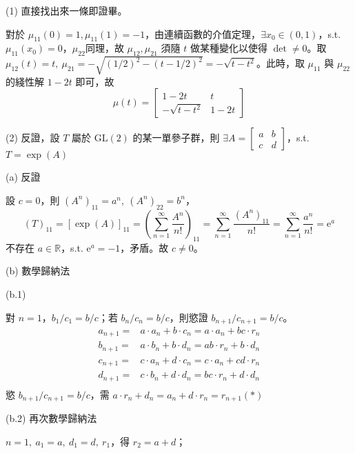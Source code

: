 \documentclass{article}
\begin{document}
\begin{framed}
  (1) 直接找出來一條即證畢。

  對於 $\mu_{11}(0)=1,\mu_{11}(1)=-1$，由連續函數的介值定理，$\exists x_0\in(0,1)$，s.t. $\mu_{11}(x_0)=0$，$\mu_{22}$同理，故 $\mu_{12},\mu_{21}$ 須隨 $t$ 做某種變化以使得 $\det\neq 0$。取 $\mu_{12}(t)=t,\ \mu_{21}=-\sqrt{(1/2)^2-(t-1/2)^2}=-\sqrt{t-t^2}$。此時，取 $\mu_{11}$ 與 $\mu_{22}$ 的綫性解 $1-2t$ 即可，故
  $$\mu(t)=\begin{bmatrix}
      1-2t          & t    \\
      -\sqrt{t-t^2} & 1-2t
    \end{bmatrix}$$

  (2) 反證，設 $T$ 屬於 $\mathrm{GL}(2)$ 的某一單參子群，則 $\exists A=\begin{bmatrix}  a &b \\  c& d \end{bmatrix}$，s.t. $T=\exp(A)$

  (a) 反證

  設 $c=0$，則 $(A^n)_{11}=a^n,\ (A^n)_{22}=b^n$，
  $${\left( T \right)_{11}} = {\left[ {\exp \left( A \right)} \right]_{11}} = {\left( {\sum\limits_{n = 1}^\infty  {\frac{{{A^n}}}{{n!}}} } \right)_{11}} = \sum\limits_{n = 1}^\infty  {\frac{{{{\left( {{A^n}} \right)}_{11}}}}{{n!}} = } \sum\limits_{n = 1}^\infty  {\frac{{{a^n}}}{{n!}} = } {{\text{e}}^a}$$
  不存在 $a\in\mathbb{R}$，s.t. $\mathrm{e}^a=-1$，矛盾。故 $c\neq 0$。

  (b) 數學歸納法

  (b.1)

  對 $n=1$，$b_1/c_1=b/c$；若 $b_n/c_n=b/c$，則慾證 $b_{n+1}/c_{n+1}=b/c$。
  $$\begin{aligned}
      {a_{n + 1}} = & a \cdot {a_n} + b \cdot {c_n} = a \cdot {a_n} + bc \cdot {r_n} \\
      {b_{n + 1}} = & a \cdot {b_n} + b \cdot {d_n} = ab \cdot {r_n} + b \cdot {d_n} \\
      {c_{n + 1}} = & c \cdot {a_n} + d \cdot {c_n} = c \cdot {a_n} + cd \cdot {r_n} \\
      {d_{n + 1}} = & c \cdot {b_n} + d \cdot {d_n} = bc \cdot {r_n} + d \cdot {d_n} \\
    \end{aligned}$$
  慾 $b_{n+1}/c_{n+1}=b/c$，需 $a \cdot {r_n} + {d_n} = {a_n} + d \cdot {r_n} = {r_{n + 1}}(*)$

  (b.2) 再次數學歸納法

  $n=1,\ a_1=a,\ d_1=d,\ r_1$，得 $r_2=a+d$；


\end{framed}
\end{document}
